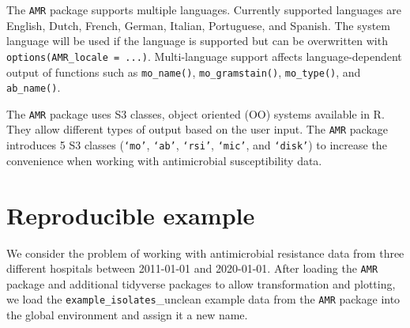 \documentclass[
]{book}
\begin{document}
The \texttt{AMR} package supports multiple languages. Currently supported languages are English, Dutch, French, German, Italian, Portuguese, and Spanish. The system language will be used if the language is supported but can be overwritten with \texttt{options(AMR\_locale\ =\ ...)}. Multi-language support affects language-dependent output of functions such as \texttt{mo\_name()}, \texttt{mo\_gramstain()}, \texttt{mo\_type()}, and \texttt{ab\_name()}.

The \texttt{AMR} package uses S3 classes, object oriented (OO) systems available in R. They allow different types of output based on the user input. The \texttt{AMR} package introduces 5 S3 classes (\texttt{‘mo’}, \texttt{‘ab’}, \texttt{‘rsi’}, \texttt{‘mic’}, and \texttt{‘disk’}) to increase the convenience when working with antimicrobial susceptibility data.

\hypertarget{reproducible-example}{%
\section{Reproducible example}\label{reproducible-example}}

We consider the problem of working with antimicrobial resistance data from three different hospitals between 2011-01-01 and 2020-01-01. After loading the \texttt{AMR} package and additional tidyverse packages to allow transformation and plotting, we load the \texttt{example\_isolates}\_unclean example data from the \texttt{AMR} package into the global environment and assign it a new name.
\end{document}
